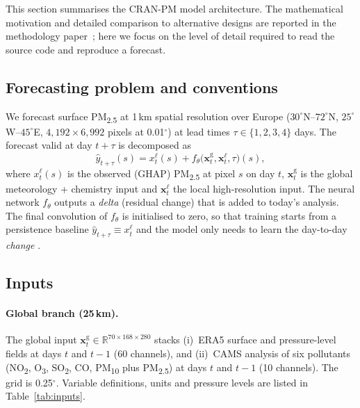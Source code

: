 
This section summarises the CRAN-PM model architecture. The
mathematical motivation and detailed comparison to alternative
designs are reported in the methodology paper~\citep{kheder2026eccv};
here we focus on the level of detail required to read the source
code and reproduce a forecast.

\subsection{Forecasting problem and conventions}
\label{sec:model:problem}

We forecast surface PM\textsubscript{2.5} at 1\,km spatial resolution
over Europe ($30^\circ$N--$72^\circ$N, $25^\circ$W--$45^\circ$E,
$4{,}192 \times 6{,}992$ pixels at 0.01$^\circ$) at lead times
$\tau \in \{1, 2, 3, 4\}$ days. The forecast valid at day $t+\tau$
is decomposed as
\begin{equation}
\hat{y}_{t+\tau}(s) = x^{\ell}_t(s) + f_\theta\!\big(\mathbf{x}^{\text{g}}_t,
\mathbf{x}^{\ell}_t, \tau\big)(s),
\label{eq:delta}
\end{equation}
where $x^{\ell}_t(s)$ is the observed (GHAP) PM\textsubscript{2.5}
at pixel $s$ on day $t$, $\mathbf{x}^{\text{g}}_t$ is the global
meteorology + chemistry input and $\mathbf{x}^{\ell}_t$ the local
high-resolution input. The neural network $f_\theta$ outputs a
\emph{delta} (residual change) that is added to today's analysis.
The final convolution of $f_\theta$ is initialised to zero, so that
training starts from a persistence baseline $\hat{y}_{t+\tau} \equiv
x^{\ell}_t$ and the model only needs to learn the day-to-day
\emph{change} \citep{bi2023pangu, lam2023graphcast}.

\subsection{Inputs}
\label{sec:model:inputs}

\paragraph{Global branch (25\,km).}
The global input $\mathbf{x}^{\text{g}}_t \in \mathbb{R}^{70 \times 168 \times 280}$
stacks (i)~ERA5 surface and pressure-level fields at days $t$ and
$t-1$ (60 channels), and (ii)~CAMS analysis of six pollutants
(NO\textsubscript{2}, O\textsubscript{3}, SO\textsubscript{2}, CO,
PM\textsubscript{10} plus PM\textsubscript{2.5}) at days $t$ and
$t-1$ (10 channels). The grid is 0.25$^\circ$. Variable definitions,
units and pressure levels are listed in Table~\ref{tab:inputs}.

